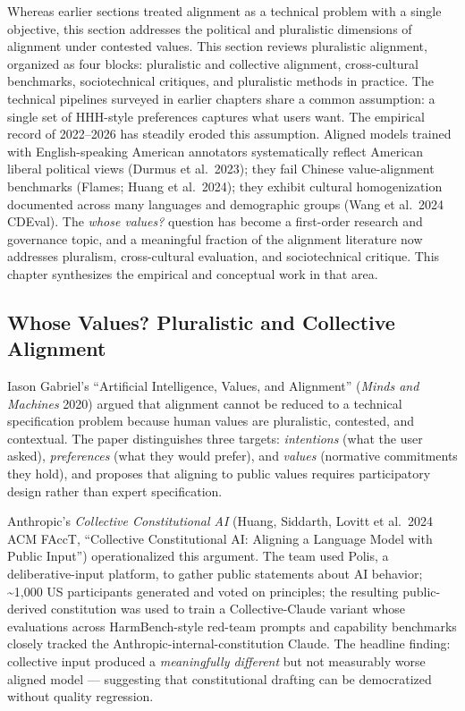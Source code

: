 \documentclass{article}
\begin{document}
Whereas earlier sections treated alignment as a technical problem with a single objective, this section addresses the political and pluralistic dimensions of alignment under contested values. This section reviews pluralistic alignment, organized as four blocks: pluralistic and collective alignment, cross-cultural benchmarks, sociotechnical critiques, and pluralistic methods in practice. The technical pipelines surveyed in earlier chapters share a common assumption: a single set of HHH-style preferences captures what users want. The empirical record of 2022--2026 has steadily eroded this assumption. Aligned models trained with English-speaking American annotators systematically reflect American liberal political views (Durmus et al.~2023); they fail Chinese value-alignment benchmarks (Flames; Huang et al.~2024); they exhibit cultural homogenization documented across many languages and demographic groups (Wang et al.~2024 CDEval). The \emph{whose values?} question has become a first-order research and governance topic, and a meaningful fraction of the alignment literature now addresses pluralism, cross-cultural evaluation, and sociotechnical critique. This chapter synthesizes the empirical and conceptual work in that area.

\subsection{Whose Values? Pluralistic and Collective Alignment}\label{whose-values-pluralistic-and-collective-alignment}

Iason Gabriel's ``Artificial Intelligence, Values, and Alignment'' (\emph{Minds and Machines} 2020) argued that alignment cannot be reduced to a technical specification problem because human values are pluralistic, contested, and contextual. The paper distinguishes three targets: \emph{intentions} (what the user asked), \emph{preferences} (what they would prefer), and \emph{values} (normative commitments they hold), and proposes that aligning to public values requires participatory design rather than expert specification.

Anthropic's \emph{Collective Constitutional AI} (Huang, Siddarth, Lovitt et al.~2024 ACM FAccT, ``Collective Constitutional AI: Aligning a Language Model with Public Input'') operationalized this argument. The team used Polis, a deliberative-input platform, to gather public statements about AI behavior; \textasciitilde1,000 US participants generated and voted on principles; the resulting public-derived constitution was used to train a Collective-Claude variant whose evaluations across HarmBench-style red-team prompts and capability benchmarks closely tracked the Anthropic-internal-constitution Claude. The headline finding: collective input produced a \emph{meaningfully different} but not measurably worse aligned model --- suggesting that constitutional drafting can be democratized without quality regression.
\end{document}
